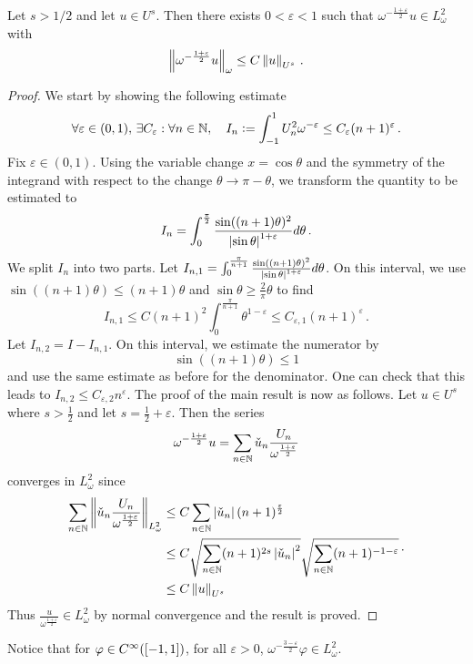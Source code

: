 \documentclass[a4paper]{article}
\begin{document}
\begin{Lem}
	Let $s > 1/2$ and let $u \in U^{s}$. Then there exists $0 < \varepsilon < 1$ such that ${\omega^{-\frac{1 + \varepsilon}{2}}}u \in L^2_\omega$ with 
	\[\left\|\omega^{-\frac{1 + \varepsilon}{2}}u\right\|_\omega \leq C \left\|u\right\|_{U^s}\,.\]
	\begin{proof}
		We start by showing the following estimate
		\[\forall \varepsilon \in (0, 1),  \, \exists C_\varepsilon : \forall n \in \mathbb{N}, \quad I_n \mathrel{\mathop:}= \int_{-1}^{1} U_n^2 \omega^{-\varepsilon} \leq C_\varepsilon (n+1)^{\varepsilon}\,.\]
		Fix $ \varepsilon \in (0,1)$. Using the variable change $x = \cos\theta$ and the symmetry of the integrand with respect to the change $\theta \to \pi - \theta$, we transform the quantity to be estimated to
		\[I_{n} = \int_{0}^{\frac{\pi}{2}} \frac{\sin((n+1)\theta)^2}{\left\lvert \sin\theta \right\rvert^{1 + \varepsilon}}d\theta\,.\]
		We split $I_n$ into two parts. Let $I_{n,1} =  \int_{0}^{\frac{\pi}{n+1}} \frac{\sin((n+1)\theta)^2}{\left\lvert \sin\theta \right\rvert^{1 + \varepsilon}}d\theta$. On this interval, we use $\sin((n+1)\theta) \leq (n+1)\theta$ and $\sin\theta \geq \frac{2}{\pi}\theta$ to find 
		\[I_{n,1} \leq C (n+1)^2\int_{0}^{\frac{\pi}{n+1}} \theta^{1 - \varepsilon} \leq C_{\varepsilon,1} (n+1)^{\varepsilon}\,.\]
		Let $I_{n,2} = I - I_{n,1}$. On this interval, we estimate the numerator by 
		\[\sin((n+1)\theta) \leq 1\] 
		and use the same estimate as before for the denominator. One can check that this leads to $I_{n,2} \leq C_{\varepsilon,2}n^{\varepsilon}$. The proof of the main result is now as follows. Let $u \in U^s$ where $s > \frac{1}{2}$ and let $s = \frac{1}{2} + \varepsilon$. Then the series 
		\[{\omega^{-\frac{1 + \varepsilon}{2}}}u = \sum_{n \in \mathbb{N}} \check{u}_n \frac{U_n}{\omega^{\frac{1 +\varepsilon}{2}}}\]
		converges in $L^2_\omega$ since 
		\[\begin{split}
		\sum_{n \in \mathbb{N}} \left\|\check{u}_n \frac{U_n}{\omega^{\frac{1+\varepsilon}{2}}}\right\|_{L^2_\omega} &\leq C \sum_{n \in \mathbb{N}} \left\lvert \check{u}_n \right\rvert (n+1)^{\frac{\varepsilon}{2}}\\
		&\leq C \sqrt{\sum_{n\in \mathbb{N}}(n+1)^{2s}\left\lvert \check{u}_n \right\rvert^2} \sqrt{\sum_{n\in \mathbb{N}}(n+1)^{-1 - \varepsilon}}\\
		&\leq C \left\|u\right\|_{U^s}\end{split}\,.\]
		Thus $\frac{u}{\omega^{\frac{1 + \varepsilon}{2}}} \in L^2_\omega$ by normal convergence and the result is proved. 
	\end{proof} 
\end{Lem}
\noindent Notice that for $\varphi \in C^{\infty}([-1,1])$, for all $\varepsilon > 0$, ${\omega^{-\frac{3-\varepsilon}{2}}} \varphi \in L^2_\omega$. 
\end{document}
